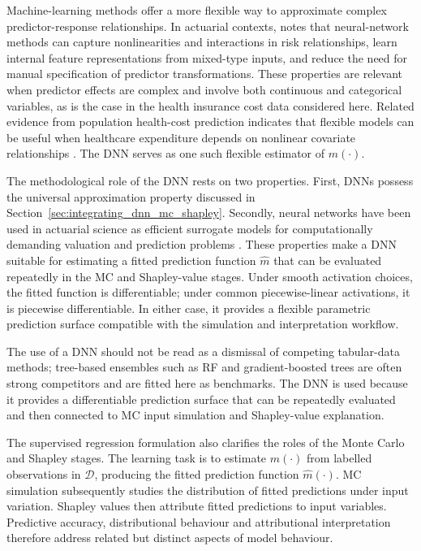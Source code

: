   \noindent
  Machine-learning methods offer a more flexible way to approximate complex
  predictor-response relationships. In actuarial contexts,
  \citet{richman2021ai} notes that neural-network methods can capture
  nonlinearities and interactions in risk relationships, learn internal feature
  representations from mixed-type inputs, and reduce the need for manual
  specification of predictor transformations. These properties are relevant when
  predictor effects are complex and involve both continuous and categorical
  variables, as is the case in the health insurance cost data considered here.
  Related evidence from population health-cost prediction indicates that flexible
  models can be useful when healthcare expenditure depends on nonlinear covariate
  relationships \citep{dreweboss2022deep}. The DNN serves as one such flexible estimator of
  \(m(\cdot)\).

\newpage
\noindent
The methodological role of the DNN rests on two properties. First,
DNNs possess the universal approximation property
discussed in Section~\ref{sec:integrating_dnn_mc_shapley}. Secondly, neural networks have been used
in actuarial science as efficient surrogate models for computationally demanding
valuation and prediction problems \citep{hejazi2016neural}. These properties
make a DNN suitable for estimating a fitted prediction function
\(\widehat{m}\) that can be evaluated repeatedly in the MC and
Shapley-value stages. Under smooth activation choices, the fitted function is
differentiable; under common piecewise-linear activations, it is piecewise
differentiable. In either case, it provides a flexible parametric prediction
surface compatible with the simulation and interpretation workflow.

\noindent
The use of a DNN should not be read as a dismissal of competing
tabular-data methods; tree-based ensembles such as RF and
gradient-boosted trees are often strong competitors
\citep{grinsztajn2022why,orji2024explainable} and are fitted here as
benchmarks. The DNN is used because it provides a differentiable
prediction surface that can be repeatedly evaluated and then connected to
MC input simulation and Shapley-value explanation.

\noindent
The supervised regression formulation also clarifies the roles of the Monte
Carlo and Shapley stages. The learning task is to estimate \(m(\cdot)\) from
labelled observations in \(\mathcal{D}\), producing the fitted prediction
function \(\widehat{m}(\cdot)\). MC simulation subsequently studies the
distribution of fitted predictions under input variation. Shapley values then
attribute fitted predictions to input variables. Predictive accuracy,
distributional behaviour and attributional interpretation therefore address
related but distinct aspects of model behaviour.

